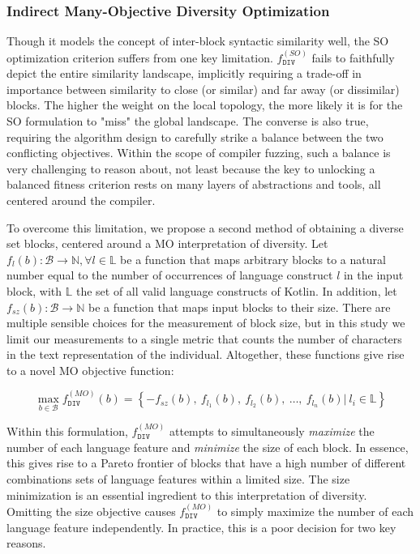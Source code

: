 \subsubsection{\label{subsec:moga}Indirect Many-Objective Diversity Optimization}

Though it models the concept of inter-block syntactic similarity well,
the \Gls{SO} optimization criterion suffers from one key limitation.
$f^{(SO)}_{\texttt{DIV}}$ fails to faithfully depict
the entire similarity landscape, implicitly requiring
a trade-off in importance between similarity
to close (or similar) and far away (or dissimilar) blocks.
The higher the weight on the local topology, the more likely it is for the \gls{SO} formulation to "miss" the global landscape.
The converse is also true, requiring the algorithm design to carefully strike
a balance between the two conflicting objectives.
Within the scope of compiler fuzzing, such a balance is very challenging to reason about,
not least because the key to unlocking a balanced fitness criterion
rests on many layers of abstractions and tools,
all centered around the compiler.

To overcome this limitation, we propose a second method
of obtaining a diverse set blocks, centered around a \Gls{MO}
interpretation of diversity. 
Let $f_l(b) : \mathcal{B} \to \mathbb{N}, \forall l \in \mathbb{L}$ be
a function that maps arbitrary blocks to a natural number
equal to the number of occurrences of language construct $l$
in the input block, with $\mathbb{L}$ the set of all valid language constructs
of Kotlin.
In addition, let $f_{sz}(b) : \mathcal{B} \to \mathbb{N}$ be a function
that maps input blocks to their size.
There are multiple sensible choices for the measurement of block size, but in this
study we limit our measurements to a single metric that counts the number of characters
in the text representation of the individual.
Altogether, these functions give rise to a novel \gls{MO} objective function:

\begin{equation}
\max_{b \in \mathcal{B}} f^{(MO)}_{\texttt{DIV}}(b) = \left\lbrace -f_{sz}(b), ~f_{l_1}(b),~f_{l_2}(b),~\dots,~f_{l_n}(b)|~l_i \in \mathbb{L} \right\rbrace
\end{equation}

Within this formulation, $f^{(MO)}_{\texttt{DIV}}$ attempts to simultaneously
\textit{maximize} the number of each language feature
and \textit{minimize} the size of each block.
In essence, this gives rise to a Pareto frontier of blocks
that have a high number of different combinations sets of language features
within a limited size.
The size minimization is an essential ingredient to this interpretation of diversity.
Omitting the size objective causes $f^{(MO)}_{\texttt{DIV}}$
to simply maximize the number of each language feature independently.
In practice, this is a poor decision for two key reasons.

